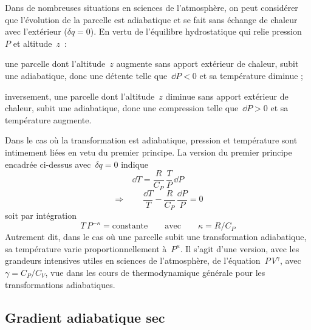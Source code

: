 \sk
Dans de nombreuses situations en sciences de l'atmosphère, on peut considérer que l'évolution de la parcelle est adiabatique et se fait sans échange de chaleur avec l'extérieur ($\delta q=0$). En vertu de l'équilibre hydrostatique qui relie pression~$P$ et altitude~$z$~:
\begin{citemize}
\item une parcelle dont l'altitude~$z$ augmente sans apport extérieur de chaleur, subit une  adiabatique, donc une détente telle que~$\dd P < 0$ et sa température diminue ;
\item inversement, une parcelle dont l'altitude~$z$ diminue sans apport extérieur de chaleur, subit une  adiabatique, donc une compression telle que~$\dd P > 0$ et sa température augmente. 
\end{citemize}

\sk
Dans le cas où la transformation est adiabatique, pression et température sont intimement liées en vetu du premier principe. La version du premier principe encadrée ci-dessus avec~$\delta q = 0$ indique
\[ \dd T = \frac{R}{C_P} \, \frac{T}{P} \, \dd P\]
\[ \Rightarrow \qquad \frac{\dd T}{T} - \frac{R}{C_P} \, \frac{\dd P}{P} = 0 \]
soit par intégration
\[ T \, P^{- \kappa} = \text{constante} \qquad \text{avec} \qquad \kappa = R / C_P \]
Autrement dit, dans le cas où une parcelle subit une transformation adiabatique, sa température varie proportionnellement à~$P^{\kappa}$. Il s'agit d'une version, avec les grandeurs intensives utiles en sciences de l'atmosphère, de l'équation~$P\,V^{\gamma}$, avec $\gamma = C_P / C_V$, vue dans les cours de thermodynamique générale pour les transformations adiabatiques.


\sk
\subsection{Gradient adiabatique sec} \label{adiabsec}

